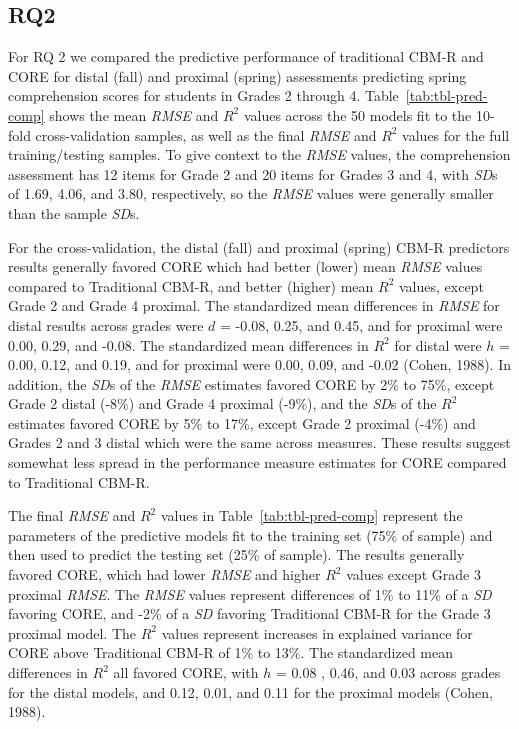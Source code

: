 \documentclass[
  english,
  man, fleqn, noextraspace]{apa6}
\begin{document}
\hypertarget{rq2}{%
\subsection{RQ2}\label{rq2}}

For RQ 2 we compared the predictive performance of traditional CBM-R and CORE for distal (fall) and proximal (spring) assessments predicting spring comprehension scores for students in Grades 2 through 4. Table~\ref{tab:tbl-pred-comp} shows the mean \emph{RMSE} and \(R^2\) values across the 50 models fit to the 10-fold cross-validation samples, as well as the final \emph{RMSE} and \(R^2\) values for the full training/testing samples. To give context to the \emph{RMSE} values, the comprehension assessment has 12 items for Grade 2 and 20 items for Grades 3 and 4, with \emph{SD}s of 1.69, 4.06, and 3.80, respectively, so the \emph{RMSE} values were generally smaller than the sample \emph{SD}s.

For the cross-validation, the distal (fall) and proximal (spring) CBM-R predictors results generally favored CORE which had better (lower) mean \emph{RMSE} values compared to Traditional CBM-R, and better (higher) mean \(R^2\) values, except Grade 2 and Grade 4 proximal. The standardized mean differences in \emph{RMSE} for distal results across grades were \(d\) = -0.08, 0.25, and 0.45, and for proximal were 0.00, 0.29, and -0.08. The standardized mean differences in \(R^2\) for distal were \(h\) = 0.00, 0.12, and 0.19, and for proximal were 0.00, 0.09, and -0.02 (Cohen, 1988). In addition, the \emph{SD}s of the \emph{RMSE} estimates favored CORE by 2\% to 75\%, except Grade 2 distal (-8\%) and Grade 4 proximal (-9\%), and the \emph{SD}s of the \(R^2\) estimates favored CORE by 5\% to 17\%, except Grade 2 proximal (-4\%) and Grades 2 and 3 distal which were the same across measures. These results suggest somewhat less spread in the performance measure estimates for CORE compared to Traditional CBM-R.

The final \emph{RMSE} and \(R^2\) values in Table~\ref{tab:tbl-pred-comp} represent the parameters of the predictive models fit to the training set (75\% of sample) and then used to predict the testing set (25\% of sample). The results generally favored CORE, which had lower \emph{RMSE} and higher \(R^2\) values except Grade 3 proximal \emph{RMSE}. The \emph{RMSE} values represent differences of 1\% to 11\% of a \emph{SD} favoring CORE, and -2\% of a \emph{SD} favoring Traditional CBM-R for the Grade 3 proximal model. The \(R^2\) values represent increases in explained variance for CORE above Traditional CBM-R of 1\% to 13\%. The standardized mean differences in \(R^2\) all favored CORE, with \(h\) = 0.08 , 0.46, and 0.03 across grades for the distal models, and 0.12, 0.01, and 0.11 for the proximal models (Cohen, 1988).
\end{document}
